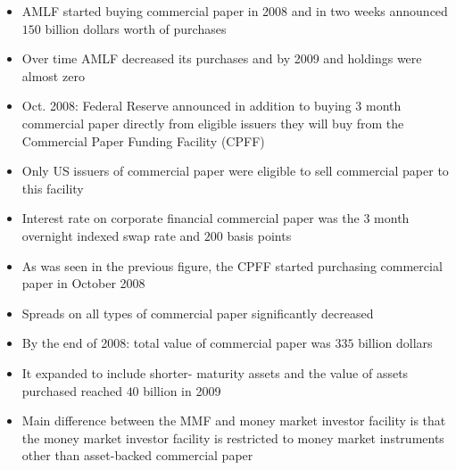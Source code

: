 \documentclass[11pt]{beamer}
\begin{document}
\begin{frame}
\begin{itemize}
\item AMLF started buying commercial paper in 2008 and in two weeks announced $150$ billion dollars worth of purchases
\item Over time AMLF decreased its purchases and by 2009 and holdings were almost zero
\item Oct. 2008: Federal Reserve announced in addition to buying $3$ month commercial paper directly from eligible issuers they will buy from the Commercial Paper Funding Facility (CPFF)
\item Only US issuers of commercial paper were eligible to sell commercial paper to this facility
\item Interest rate on corporate financial commercial paper was the $3$ month overnight indexed swap rate and $200$ basis points
\item As was seen in the previous figure, the CPFF started purchasing commercial paper in October 2008
\end{itemize}
\end{frame}

\begin{frame}
\begin{itemize}
\item Spreads on all types of commercial paper significantly decreased
\item By the end of 2008: total value of commercial paper was $335$ billion dollars
\item It expanded to include shorter- maturity assets and the value of assets purchased reached $40$ billion in 2009
\item Main difference between the MMF and money market investor facility is that the money market investor facility is restricted to money market instruments other than asset-backed commercial paper
\end{itemize}
\end{frame}
\end{document}
